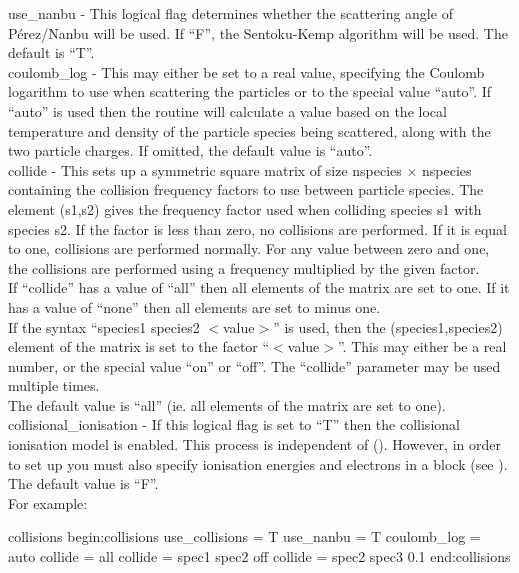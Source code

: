 {\emphtext use\_nanbu} - This logical flag determines whether the scattering
  angle of P\'erez/Nanbu will be used. If ``F'', the Sentoku-Kemp algorithm will
  be used. The default is ``T''.\\

{\emphtext coulomb\_log} - This may either be set to a real value, specifying
  the Coulomb logarithm to use when scattering the particles or to the special
  value ``auto''. If ``auto'' is used then the routine will calculate a value
  based on the local temperature and density of the particle species being
  scattered, along with the two particle charges.  If omitted,
  the default value is ``auto''.\\

{\emphtext collide} - This sets up a symmetric square matrix of size
  nspecies$\,\times\,$nspecies containing the collision frequency factors to
  use between particle species. The element (s1,s2) gives the frequency factor
  used when colliding species s1 with species s2.  If the factor is less than
  zero, no collisions are performed.  If it is equal to one, collisions are
  performed normally.  For any value between zero and one, the collisions are
  performed using a frequency multiplied by the given factor.\\
  If ``collide'' has a value of ``all'' then all elements of the matrix are
  set to one. If it has a value of ``none'' then all elements are set to minus
  one.\\
  If the syntax ``species1 species2 $<$value$>$'' is used, then the
  (species1,species2) element of the matrix is set to the factor
  ``$<$value$>$''.  This may either be a real number, or the special value
  ``on'' or ``off''. The ``collide'' parameter may be used multiple times.\\
  The default value is ``all'' (ie. all elements of the matrix are set to
  one).\\

{\emphtext collisional\_ionisation} - If this logical flag is set to ``T''
  then the collisional ionisation model is enabled. This process is independent
  of  (). However, in order to
  set up 
  you must also specify ionisation energies and electrons in a
   block (see ). The default value
  is ``F''.\\

For example:

\begin{lboxverbatim}{collisions}
begin:collisions
   use_collisions = T
   use_nanbu = T
   coulomb_log = auto
   collide = all
   collide = spec1 spec2 off
   collide = spec2 spec3 0.1
end:collisions
\end{lboxverbatim}

